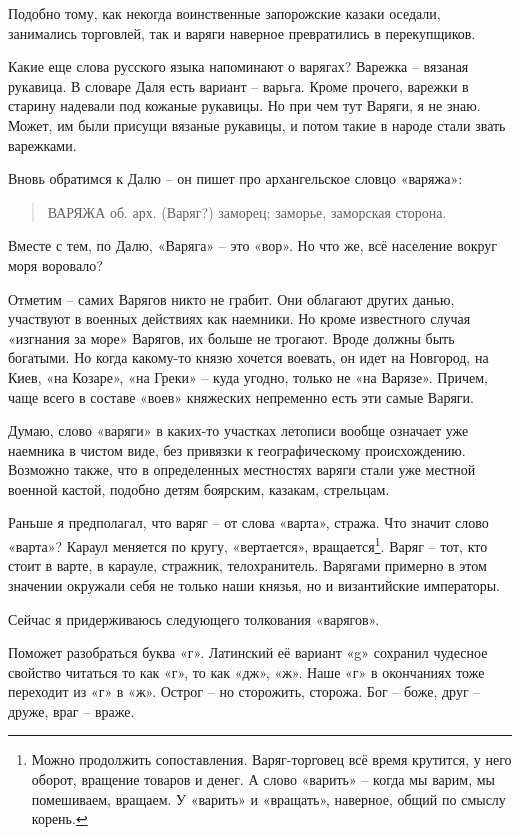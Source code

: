 Подобно тому, как некогда воинственные запорожские казаки оседали, занимались торговлей, так и варяги наверное превратились в перекупщиков. 

Какие еще слова русского языка напоминают о варягах? Варежка – вязаная рукавица. В словаре Даля есть вариант – варьга. Кроме прочего, варежки в старину надевали под кожаные рукавицы. Но при чем тут Варяги, я не знаю. Может, им были присущи вязаные рукавицы, и потом такие в народе стали звать варежками.

Вновь обратимся к Далю – он пишет про архангельское словцо «варяжа»:

\begin{quotation}
ВАРЯЖА об. арх. (Варяг?) заморец; заморье, заморская сторона.
\end{quotation}

Вместе с тем, по Далю, «Варяга» – это «вор». Но что же, всё население вокруг моря воровало? 

Отметим – самих Варягов никто не грабит. Они облагают других данью, участвуют в военных действиях как наемники. Но кроме известного случая «изгнания за море» Варягов, их больше не трогают. Вроде должны быть богатыми. Но когда какому-то князю хочется воевать, он идет на Новгород, на Киев, «на Козаре», «на Греки» – куда угодно, только не «на Варязе». Причем, чаще всего в составе «воев» княжеских непременно есть эти самые Варяги.

Думаю, слово «варяги» в каких-то участках летописи вообще означает уже наемника в чистом виде, без привязки к географическому происхождению. Возможно также, что в определенных местностях варяги стали уже местной военной кастой, подобно детям боярским, казакам, стрельцам.

Раньше я предполагал, что варяг – от слова «варта», стража. Что значит слово «варта»? Караул меняется по кругу, «вертается», вращается\footnote{Можно продолжить сопоставления. Варяг-торговец всё время крутится, у него оборот, вращение товаров и денег. А слово «варить» – когда мы варим, мы помешиваем, вращаем. У «варить» и «вращать», наверное, общий по смыслу корень.}. Варяг – тот, кто стоит в варте, в карауле, стражник, телохранитель. Варягами примерно в этом значении  окружали себя не только наши князья, но и византийские императоры.

Сейчас я придерживаюсь следующего толкования «варягов».

Поможет разобраться буква «г». Латинский её вариант «g» сохранил чудесное свойство читаться то как «г», то как «дж», «ж». Наше «г» в окончаниях тоже переходит из «г» в «ж». Острог – но сторожить, сторожа. Бог – боже, друг – друже, враг – враже.

